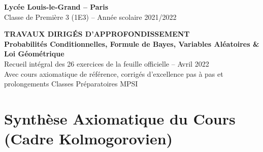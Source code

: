 \documentclass[11pt,a4paper]{article}
\begin{document}
\begin{center}
    {\LARGE \bfseries Lycée Louis-le-Grand -- Paris}\\[0.2cm]
    {\large Classe de Première 3 (1E3) -- Année scolaire 2021/2022}\\[0.3cm]
    \begin{tcolorbox}[colback=llglight,colframe=llgblue,arc=3mm,boxrule=1.2pt,center]
        \begin{center}
            {\Large \bfseries \color{llgblue} TRAVAUX DIRIGÉS D'APPROFONDISSEMENT}\\[0.15cm]
            {\large \bfseries Probabilités Conditionnelles, Formule de Bayes, Variables Aléatoires \& Loi Géométrique}\\[0.2cm]
            \small Recueil intégral des 26 exercices de la feuille officielle -- Avril 2022\\[0.1cm]
            \footnotesize Avec cours axiomatique de référence, corrigés d'excellence pas à pas et prolongements Classes Préparatoires MPSI
        \end{center}
    \end{tcolorbox}
\end{center}

\vspace{0.3cm}

\section*{Synthèse Axiomatique du Cours (Cadre Kolmogorovien)}
\end{document}
